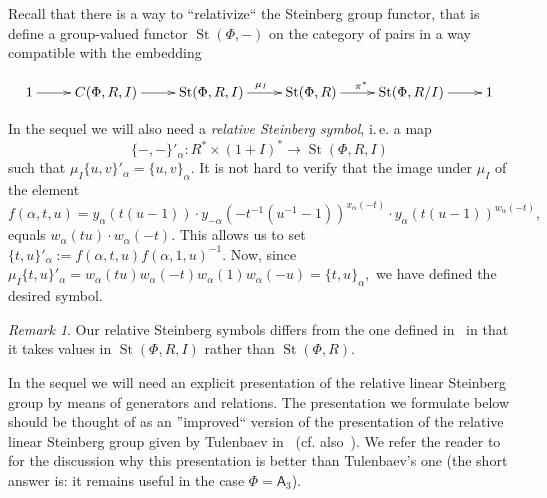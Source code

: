\documentclass[oneside, 10pt]{amsart}
\DeclareMathOperator{\St}{St}
\newcommand{\rA}{\mathsf{A}}
\newcommand{\ext}[1]{\mu_{#1}}           %
\numberwithin{equation}{section}
\numberwithin{lemma}{section}
\theoremstyle{definition}
\theoremstyle{remark}
\newtheorem{rem}[lemma]{Remark}
\begin{document}
Recall that there is a way to ``relativize`` the Steinberg group functor, that is define a group-valued functor $\St(\Phi, -)$ on the category of pairs
 in a way compatible with the embedding 

\begin{equation}
 \xymatrix{ 1 \ar[r] & C(\Phi, R, I) \ar[r] & \St(\Phi, R, I) \ar[r]^{\ext{I}} & \St(\Phi, R) \ar[r]^{\pi^*} & \St(\Phi, R/I) \ar[r] & 1 }
\end{equation}

In the sequel we will also need a {\it relative Steinberg symbol}, i.\,e. a map
\begin{equation*} \{-, -\}'_\alpha \colon R^* \times (1 + I)^* \to \St(\Phi, R, I) \end{equation*}
such that $ \ext{I} \{u, v\}'_\alpha = \{u, v\}_\alpha$. It is not hard to verify that the image under $\mu_I$ of the element
\begin{equation*} f(\alpha, t, u)= y_\alpha(t(u-1)) \cdot y_{-\alpha}(-t^{-1}(u^{-1}-1))^{x_\alpha(-t)} \cdot y_{\alpha}(t(u-1))^{w_\alpha(-t)}, \end{equation*}
equals $w_\alpha(tu) \cdot w_\alpha(-t)$. This allows us to set $\{t, u \}'_\alpha := f(\alpha, t, u) f(\alpha, 1, u)^{-1}.$
Now, since $\mu_I\{ t, u \}'_\alpha = w_\alpha(tu) w_\alpha(-t) w_\alpha(1) w_\alpha(-u) = \{t, u\}_\alpha,$ 
 we have defined the desired symbol.
\begin{rem}
 Our relative Steinberg symbols differs from the one defined in~\cite{Ste73} in that
  it takes values in $\St(\Phi, R, I)$ rather than $\St(\Phi, R)$. %
\end{rem}

In the sequel we will need an explicit presentation of the relative linear Steinberg group by means of generators and relations.
The presentation we formulate below should be thought of as an ''improved`` version of the presentation of the relative linear Steinberg group
 given by Tulenbaev in~\cite[Definition~1.5]{Tu83} (cf. also~\cite[Proposition~3.2]{LS17}).
We refer the reader to~\cite[Section~3]{LS17} for the discussion why this presentation is better than Tulenbaev's one
 (the short answer is: it remains useful in the case $\Phi = \rA_3$).
\end{document}
